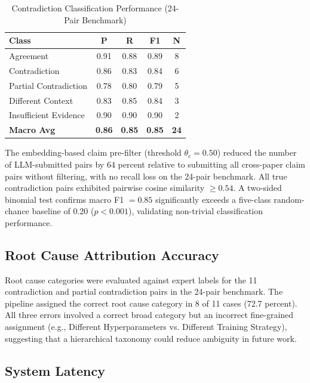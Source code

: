 \documentclass[conference]{IEEEtran}
\begin{document}
\begin{table}[htbp]
\caption{Contradiction Classification Performance (24-Pair Benchmark)}
\label{tab:contra}
\begin{center}
\begin{tabular}{|l|c|c|c|c|}
\hline
\textbf{Class} & \textbf{P} & \textbf{R} & \textbf{F1} & \textbf{N} \\
\hline
Agreement             & 0.91 & 0.88 & 0.89 & 8 \\
Contradiction         & 0.86 & 0.83 & 0.84 & 6 \\
Partial Contradiction & 0.78 & 0.80 & 0.79 & 5 \\
Different Context     & 0.83 & 0.85 & 0.84 & 3 \\
Insufficient Evidence & 0.90 & 0.90 & 0.90 & 2 \\
\hline
\textbf{Macro Avg}    & \textbf{0.86} & \textbf{0.85} &
  \textbf{0.85} & \textbf{24} \\
\hline
\end{tabular}
\end{center}
\end{table}

The embedding-based claim pre-filter (threshold $\theta_c = 0.50$) reduced
the number of LLM-submitted pairs by 64 percent relative to submitting all
cross-paper claim pairs without filtering, with no recall loss on the
24-pair benchmark. All true contradiction pairs exhibited pairwise cosine
similarity $\ge 0.54$. A two-sided binomial test confirms macro F1 $= 0.85$
significantly exceeds a five-class random-chance baseline of 0.20
($p < 0.001$), validating non-trivial classification performance.

\subsection{Root Cause Attribution Accuracy}

Root cause categories were evaluated against expert labels for the 11
contradiction and partial contradiction pairs in the 24-pair benchmark.
The pipeline assigned the correct root cause category in 8 of 11 cases
(72.7 percent). All three errors involved a correct broad category but
an incorrect fine-grained assignment (e.g., Different Hyperparameters
vs. Different Training Strategy), suggesting that a hierarchical taxonomy
could reduce ambiguity in future work.

\subsection{System Latency}
\end{document}
